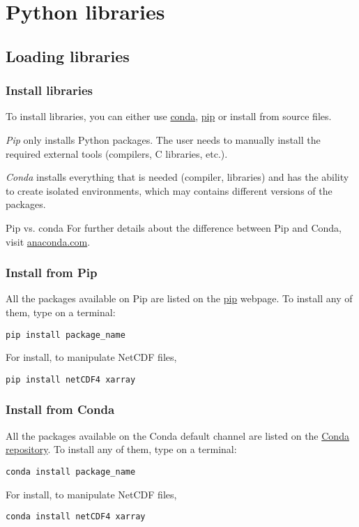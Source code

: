 \section{Python libraries}
\subsection{Loading libraries}

\begin{frame}[fragile]
\frametitle{Install libraries}
To install libraries, you can either use \href{https://docs.conda.io/en/latest/}{conda}, \href{https://pip.pypa.io/en/stable/}{pip} or install from source files.
\vspace{1em}

\emph{Pip} only installs Python packages. The user needs to manually install the required external tools (compilers, C libraries, etc.).\\
\vspace{1em}

\emph{Conda} installs everything that is needed (compiler, libraries) and has the ability to create isolated environments, which may contains different versions of the packages.
\vspace{1em}

\begin{block}{Pip vs. conda}
For further details about the difference between Pip and Conda, visit \href{https://www.anaconda.com/understanding-conda-and-pip/}{anaconda.com}.
\end{block}
\end{frame}

\begin{frame}[fragile]
\frametitle{Install from Pip}
All the packages available on Pip are listed on the \href{https://pypi.org/}{pip} webpage. To install any of them, type on a terminal:
\begin{lstlisting}[basicstyle=\scriptsize]
pip install package_name
\end{lstlisting}
\vspace{1em}

For install, to manipulate NetCDF files, 
\begin{lstlisting}[basicstyle=\scriptsize]
pip install netCDF4 xarray
\end{lstlisting}

\end{frame}

\begin{frame}[fragile]
\frametitle{Install from Conda}
All the packages available on the Conda default channel are listed on the \href{https://repo.anaconda.com/pkgs/}{Conda repository}. To install any of them, type on a terminal:
\begin{lstlisting}[basicstyle=\ttfamily\scriptsize]
conda install package_name
\end{lstlisting}
\vspace{1em}

For install, to manipulate NetCDF files, 
\begin{lstlisting}[basicstyle=\ttfamily\scriptsize]
conda install netCDF4 xarray
\end{lstlisting}
\end{frame}


